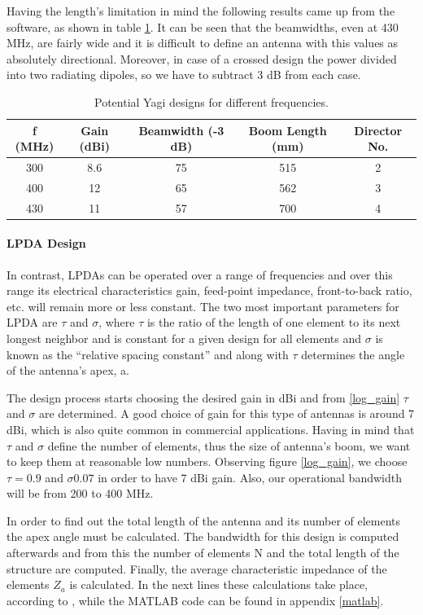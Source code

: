 Having the length's limitation in mind the following results came up from the software, as shown in table \ref{table: Yagi}. It can be seen that the beamwidths, even at 430 MHz, are fairly wide and it is difficult to define an antenna with this values as absolutely directional. Moreover, in case of a crossed design the power divided into two radiating dipoles, so we have to subtract 3 dB from each case.
\begin{table}[htb]
\begin{tabular}{| c | c | c | c | c |}
\hline
 f (MHz) & Gain (dBi) & Beamwidth (-3 dB) & Boom Length (mm) & Director No. \\ 
 \hline
 300 & 8.6 & 75 & 515 & 2 \\  
 \hline
 400 & 12 & 65 & 562 & 3\\
 \hline
  430 & 11 & 57 & 700 & 4 \\
 \hline
\end{tabular}
\caption{Potential Yagi designs for different frequencies.}
\label{table: Yagi}
\end{table}

\paragraph{LPDA Design}
In contrast, LPDAs can be operated over a range of frequencies and over this range its electrical characteristics gain, feed-point impedance, front-to-back ratio, etc. will remain more or less constant. The two most important parameters for LPDA are $\tau$ and $\sigma$, where $\tau$ is the ratio of the length of one element to its next longest neighbor and is constant for a given design for all elements and $\sigma$ is known as the “relative spacing constant” and along with $\tau$ determines the angle of the antenna’s apex, a. 

The design process starts choosing the desired gain in dBi and from \ref{log_gain} $\tau$ and $\sigma$ are determined. A good choice of gain for this type of antennas is around 7 dBi, which is also quite common in commercial applications. Having in mind that $\tau$ and $\sigma$ define the number of elements, thus the size of antenna's boom, we want to keep them at reasonable low numbers. Observing figure \ref{log_gain}, we choose $\tau=0.9$ and $\sigma0.07$ in order to have 7 dBi gain. Also, our operational bandwidth will be from 200 to 400 MHz.

In order to find out the total length of the antenna and its number of elements the apex angle must be calculated. The bandwidth for this design is computed afterwards and from this the number of elements N and the total length of the structure are computed. Finally, the average characteristic impedance of the elements $Z_{a}$ is calculated. In the next lines these calculations take place, according to \cite{balanis}, while the MATLAB code can be found in appendix \ref{matlab}.

